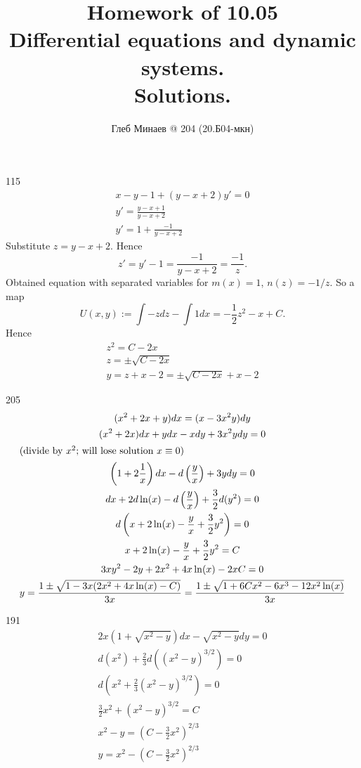 \documentclass[12pt,a4paper]{article}
\title{Homework of 10.05\\Differential equations and dynamic systems.\\Solutions.}
\author{Глеб Минаев @ 204 (20.Б04-мкн)}
\date{}
\begin{document}
    \maketitle

    \begin{problem}{115}
        \begin{gather*}
            x - y - 1 + (y-x+2)y' = 0\\
            y' = \frac{y-x+1}{y-x+2}\\
            y' = 1 + \frac{-1}{y-x+2}
        \end{gather*}
        Substitute $z = y-x+2$. Hence
        \[z' = y' - 1 = \frac{-1}{y-x+2} = \frac{-1}{z}.\]
        Obtained equation with separated variables for $m(x) = 1$, $n(z) = -1/z$. So a map
        \[U(x, y) := \int -zdz - \int 1dx = -\frac{1}{2}z^2 - x + C.\]
        Hence
        \begin{gather*}
            z^2 = C - 2x\\
            z = \pm\sqrt{C - 2x}\\
            y = z + x - 2 = \pm\sqrt{C - 2x} + x - 2
        \end{gather*}
    \end{problem}

    \begin{problem}{205}
        \begin{gather*}
            (x^2 + 2x + y)dx = (x-3x^2y)dy\\
            (x^2 + 2x)dx + ydx - xdy + 3x^2ydy = 0\\
            \intertext{(divide by $x^2$; will lose solution $x \equiv 0$)}
            \left(1 + 2\frac{1}{x}\right)dx - d\left(\frac{y}{x}\right) + 3ydy = 0\\
            dx + 2d\ln(x) - d\left(\frac{y}{x}\right) + \frac{3}{2}d(y^2) = 0\\
            d\left(x + 2\ln(x) - \frac{y}{x} + \frac{3}{2}y^2\right) = 0\\
            x + 2\ln(x) - \frac{y}{x} + \frac{3}{2}y^2 = C\\
            3xy^2 - 2y + 2x^2 + 4x\ln(x) - 2xC = 0\\
            y = \frac{1 \pm \sqrt{1 - 3x(2x^2 + 4x\ln(x) - C)}}{3x} = \frac{1 \pm \sqrt{1 + 6Cx^2 - 6x^3 - 12x^2\ln(x)}}{3x}
        \end{gather*}
    \end{problem}

    \begin{problem}{191}
        \begin{gather*}
            2x\left(1 + \sqrt{x^2 - y}\right)dx  - \sqrt{x^2 - y}dy = 0\\
            d(x^2) + \frac{2}{3}d\left((x^2 - y)^{3/2}\right) = 0\\
            d\left(x^2 + \frac{2}{3}(x^2 - y)^{3/2}\right) = 0\\
            \frac{3}{2}x^2 + (x^2 - y)^{3/2} = C\\
            x^2 - y = \left(C - \frac{3}{2}x^2\right)^{2/3}\\
            y = x^2 - \left(C - \frac{3}{2}x^2\right)^{2/3}\\
        \end{gather*}
    \end{problem}
\end{document}

